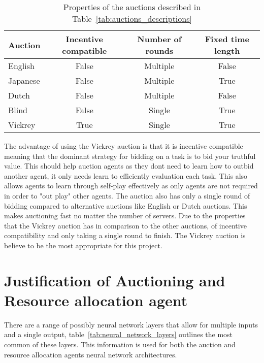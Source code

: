 \begin{table}[h]
    \centering
    \begin{tabular}{|l|c|c|c|} \hline
        \textbf{Auction}  & \textbf{Incentive compatible} & \textbf{Number of rounds} & \textbf{Fixed time length} \\ \hline
        English           & False                         & Multiple                  & False            \\ \hline
        Japanese          & False                         & Multiple                  & True             \\ \hline
        Dutch             & False                         & Multiple                  & False            \\ \hline
        Blind             & False                         & Single                    & True             \\ \hline
        Vickrey           & True                          & Single                    & True             \\ \hline
    \end{tabular}
    \caption{Properties of the auctions described in Table~\ref{tab:auctions_descriptions}}
    \label{tab:auction_properties}
\end{table}

The advantage of using the Vickrey auction is that it is incentive compatible meaning that the dominant strategy for
bidding on a task is to bid your truthful value. This should help auction agents as they dont need to learn how to
outbid another agent, it only needs learn to efficiently evaluation each task. This also allows agents to learn through
self-play effectively as only agents are not required in order to "out play" other agents. The auction also has only a
single round of bidding compared to alternative auctions like English or Dutch auctions. This makes auctioning fast
no matter the number of servers. Due to the properties that the Vickrey auction has in comparison to the other auctions,
of incentive compatibility and only taking a single round to finish. The Vickrey auction is believe to be the most
appropriate for this project.

\section{Justification of Auctioning and Resource allocation agent}\label{sec:justification-of-auctioning-and-resource-allocation-agent}
There are a range of possibly neural network layers that allow for multiple inputs and a single output,
table~\ref{tab:neural_network_layers} outlines the most common of these layers. This information is used for both the
auction and resource allocation agents neural network architectures.

